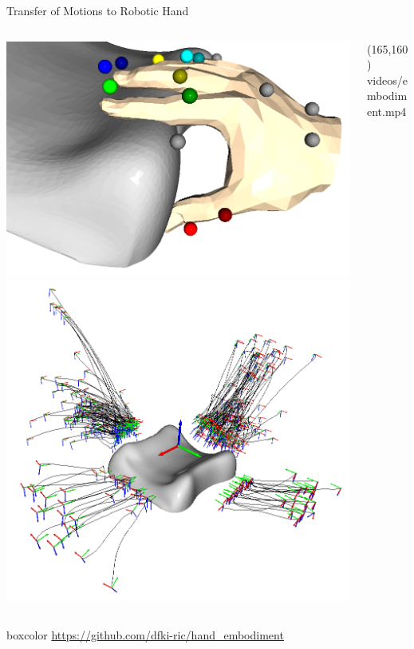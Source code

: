 \documentclass[14pt,aspectratio=169]{beamer}
\begin{document}
\begin{frame}[fragile]{Transfer of Motions to Robotic Hand}
\begin{columns}
	\begin{column}{0.3\textwidth}
		\includegraphics[width=\textwidth]{images/embodiment_record}
		\includegraphics[width=\textwidth]{images/embodiment_dataset}
	\end{column}
	\begin{column}{0.5\textwidth}
		\makebox(165,160){
			{videos/embodiment.mp4}}%
	\end{column}
\end{columns}
\begin{beamercolorbox}[wd=\textwidth,sep=5pt]{boxcolor}
\centering
{\footnotesize \url{https://github.com/dfki-ric/hand_embodiment} \parencite{Fabisch2022}}
\end{beamercolorbox}
\end{frame}
\end{document}
